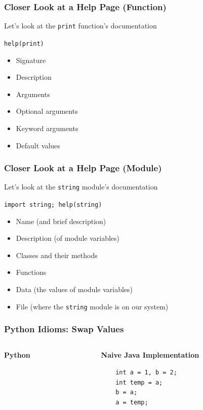 \documentclass{beamer}
\begin{document}
\begin{frame}
  \frametitle{Closer Look at a Help Page (Function)}
  Let's look at the \texttt{print} function's 
  documentation

  \lstinline{help(print)}

  \begin{itemize}
    \item Signature
    \item Description
    \item Arguments
    \item Optional arguments
    \item Keyword arguments
    \item Default values
  \end{itemize}

\end{frame}


\begin{frame}
  \frametitle{Closer Look at a Help Page (Module)}
  Let's look at the \texttt{string} module's 
  documentation

  \lstinline{import string; help(string)}

  \begin{itemize}
    \item Name (and brief description)
    \item Description (of module variables)
    \item Classes and their methods
    \item Functions
    \item Data (the values of module variables)
    \item File (where the \texttt{string} module is on our system)
   \end{itemize}

\end{frame}

\begin{frame}[fragile]
  \frametitle{Python Idioms: Swap Values}
  \begin{columns}
  \begin{column}{0.5\textwidth}
    \textbf{Python}
    \inputminted{python}{swap.py}
  \end{column}
  \begin{column}{0.5\textwidth}
  \textbf{Naive Java Implementation}
  \begin{lstlisting}
    int a = 1, b = 2;
    int temp = a;
    b = a;
    a = temp;
  \end{lstlisting}
  \end{column}
  \end{columns}
\end{frame}
\end{document}
